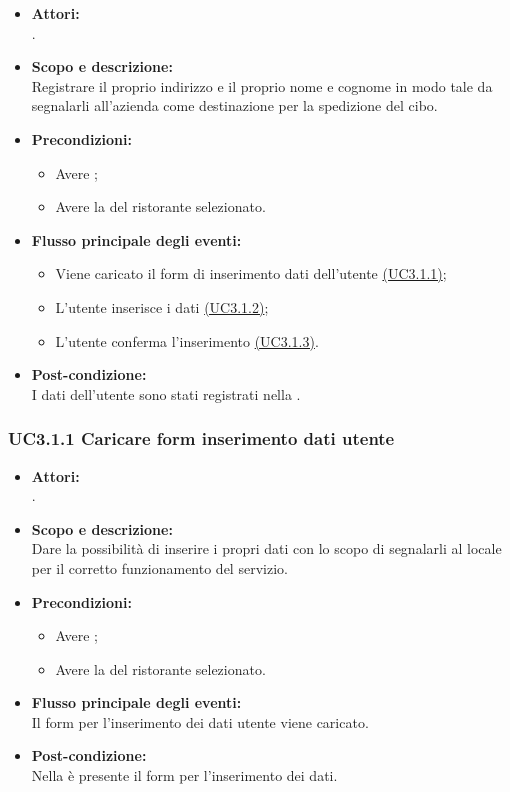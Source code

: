 \begin{itemize}
	\item \textbf{Attori:}
	\\.
	\item \textbf{Scopo e descrizione:} 
	\\Registrare il proprio indirizzo e il proprio nome e cognome in modo tale da segnalarli all'azienda come destinazione per la spedizione del cibo.
	\item \textbf{Precondizioni:}
	\begin{itemize}
		\item Avere ;
		\item Avere la  del ristorante selezionato.
	\end{itemize}
	\item \textbf{Flusso principale degli eventi:}
	\begin{itemize}
		\item Viene caricato il form di inserimento dati dell'utente \hyperref[UC3.1.1]{(UC3.1.1)};
		\item L'utente inserisce i dati \hyperref[UC3.1.2]{(UC3.1.2)};
		\item L'utente conferma l'inserimento \hyperref[UC3.1.3]{(UC3.1.3)}.
	\end{itemize}
	\item \textbf{Post-condizione:}
	\\I dati dell'utente sono stati registrati nella .
\end{itemize}

\subsubsection{UC3.1.1 Caricare form inserimento dati utente} \label{UC3.1.1}

\begin{itemize}
	\item \textbf{Attori:}
	\\.
	\item \textbf{Scopo e descrizione:} 
	\\Dare la possibilità di inserire i propri dati con lo scopo di segnalarli al locale per il corretto funzionamento del servizio.
	\item \textbf{Precondizioni:}
	\begin{itemize}
		\item Avere ;
		\item Avere la  del ristorante selezionato.
	\end{itemize}
	\item \textbf{Flusso principale degli eventi:}
	\\Il form per l'inserimento dei dati utente viene caricato.
	\item \textbf{Post-condizione:}
	\\Nella {} è presente il form per l'inserimento dei dati.
\end{itemize}


